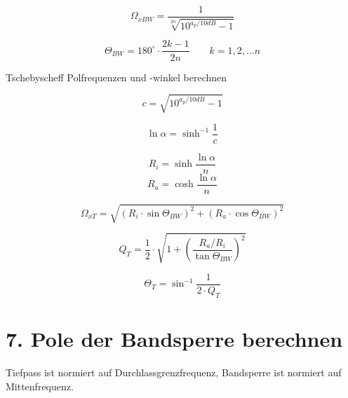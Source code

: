\documentclass[a4paper, 12pt]{report}
\begin{document}
	\begin{minipage}[t]{0.33\textwidth}
		\vspace{-0.5cm}
		\[ \Omega_{xBW} = \frac{1}{\sqrt[2n]{10^{a_p / 10dB} - 1}} \]
	\end{minipage}
	\begin{minipage}[t]{0.66\textwidth}
		\[ \Theta_{BW} = 180^{\circ} \cdot \frac{2k-1}{2n}  \qquad  k = 1, 2, ... n \]
	\end{minipage}
	
	\vspace{0.5cm}
	
	Tschebyscheff Polfrequenzen und -winkel berechnen

	\begin{minipage}[t]{0.33\textwidth}
			\[ c = \sqrt{10^{a_p / 10 dB} - 1} \]
	\end{minipage}
	\begin{minipage}[t]{0.33\textwidth}
			\vspace{0.4cm}
			\[ \ln{\alpha} = \sinh^{-1}{\frac{1}{c}} \]
	\end{minipage}
	\begin{minipage}[t]{0.33\textwidth}
			\[ R_i = \sinh{\frac{\ln{\alpha}}{n}} \]
			\[ R_a = \cosh{\frac{\ln{\alpha}}{n}} \]
	\end{minipage}
	
	\begin{minipage}[t]{0.6\textwidth}
		\[ \Omega_{xT} = \sqrt{(R_i \cdot \sin{\Theta_{BW}})^2 + (R_a \cdot \cos{\Theta_{BW}})^2} \]
	\end{minipage}
	
	\vspace{0.5cm}
	
	\begin{minipage}[t]{0.6\textwidth}
		\[ Q_T = \frac{1}{2} \cdot \sqrt{1 + \left(\frac{R_a / R_i}{\tan{\Theta_{BW}}}\right)^2} \]
	\end{minipage}
	\begin{minipage}[t]{0.4\textwidth}
		\[ \Theta_T = \sin^{-1}{\frac{1}{2 \cdot Q_T}} \]
	\end{minipage}
	

\clearpage

\section*{7. Pole der Bandsperre berechnen}

	Tiefpass ist normiert auf Durchlassgrenzfrequenz, Bandsperre ist normiert auf Mittenfrequenz.
	
\end{document}
